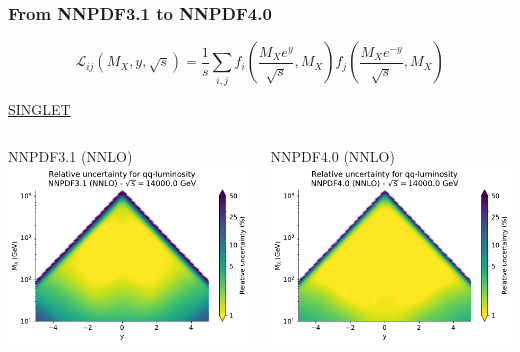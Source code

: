 \documentclass{beamer}
\begin{document}
\begin{frame}
 \frametitle{From NNPDF3.1 to NNPDF4.0}
 \footnotesize
 \centering
 \scriptsize
 \vspace{-0.1cm}
 \begin{equation}
  \mathcal{L}_{ij}(M_X,y,\sqrt{s})=\frac{1}{s}\sum_{i,j}
  f_i\left(\frac{M_Xe^y}{\sqrt{s}},M_X\right) 
  f_j\left(\frac{M_Xe^{-y}}{\sqrt{s}},M_X \right)
  \nonumber
 \end{equation}
 \footnotesize
 \begin{overlayarea}{\textwidth}{5.2cm}
  {
  \centering
  \underline{SINGLET}\\
  \begin{columns}[c]
   \begin{column}{0.5\textwidth}
    \centering
        NNPDF3.1 (NNLO)\\
        \vspace{0.1cm}
        \includegraphics[width=\columnwidth]{plots/plot_lumi2d_uncertainty_NNPDF31_qq}\\
   \end{column}
   \begin{column}{0.5\textwidth}
    \centering
        NNPDF4.0 (NNLO)\\
        \vspace{0.1cm}
        \includegraphics[width=\columnwidth]{plots/plot_lumi2d_uncertainty_NNPDF40_qq}\\    

\end{column}
\end{columns}}
\end{overlayarea}
\end{frame}
\end{document}
